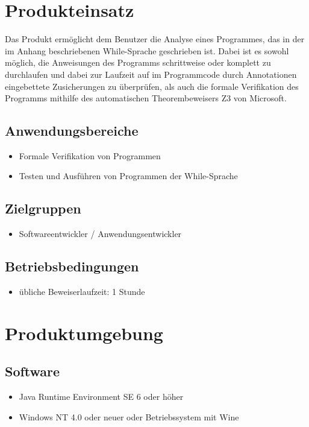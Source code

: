 \documentclass[a4paper,10pt]{article}
\begin{document}
\section{Produkteinsatz}
Das Produkt erm\"{o}glicht dem Benutzer die Analyse eines Programmes, das in der im Anhang beschriebenen While-Sprache geschrieben ist. Dabei ist es sowohl m\"{o}glich, die Anweisungen des Programms schrittweise oder komplett zu durchlaufen und dabei zur Laufzeit auf im Programmcode durch Annotationen eingebettete Zusicherungen zu \"{u}berpr\"{u}fen, als auch die formale Verifikation des Programms mithilfe des automatischen Theorembeweisers Z3 von Microsoft.

\subsection{Anwendungsbereiche}
\begin{itemize}
  \item Formale Verifikation von Programmen
  \item Testen und Ausf\"{u}hren von Programmen der While-Sprache
\end{itemize}

\subsection{Zielgruppen}
\begin{itemize}
  \item Softwareentwickler / Anwendungsentwickler
\end{itemize}

\subsection{Betriebsbedingungen}
\begin{itemize}
  \item \"{u}bliche Beweiserlaufzeit: 1 Stunde
\end{itemize}

\section{Produktumgebung}
\subsection{Software}
\begin{itemize}
  \item Java Runtime Environment SE 6 oder h\"{o}her
  \item Windows NT 4.0 oder neuer oder Betriebssystem mit Wine
\end{itemize}
\end{document}
